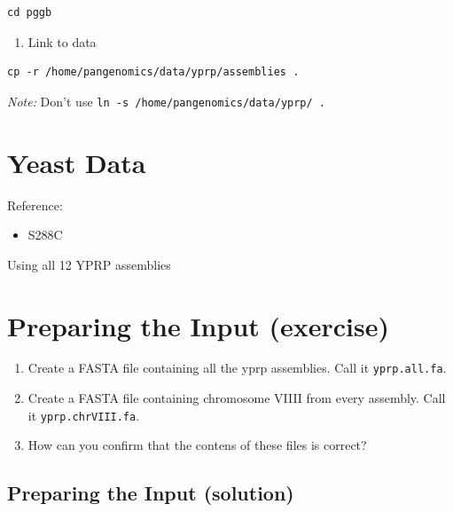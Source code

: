 \documentclass[
]{book}
\providecommand{\tightlist}{%
  \setlength{\itemsep}{0pt}\setlength{\parskip}{0pt}}
\begin{document}
\begin{verbatim}
cd pggb
\end{verbatim}

\begin{enumerate}
\def\labelenumi{\arabic{enumi}.}
\setcounter{enumi}{3}
\tightlist
\item
  Link to data
\end{enumerate}

\begin{verbatim}
cp -r /home/pangenomics/data/yprp/assemblies .
\end{verbatim}

\emph{Note:} Don't use \texttt{ln\ -s\ /home/pangenomics/data/yprp/\ .}

\hypertarget{yeast-data-2}{%
\section{Yeast Data}\label{yeast-data-2}}

Reference:

\begin{itemize}
\tightlist
\item
  S288C
\end{itemize}

Using all 12 YPRP assemblies

\hypertarget{preparing-the-input-exercise-2}{%
\section{Preparing the Input (exercise)}\label{preparing-the-input-exercise-2}}

\begin{enumerate}
\def\labelenumi{\arabic{enumi}.}
\tightlist
\item
  Create a FASTA file containing all the yprp assemblies. Call it \texttt{yprp.all.fa}.
\item
  Create a FASTA file containing chromosome VIIII from every assembly. Call it \texttt{yprp.chrVIII.fa}.
\item
  How can you confirm that the contens of these files is correct?
\end{enumerate}

\hypertarget{preparing-the-input-solution-1}{%
\subsection{Preparing the Input (solution)}\label{preparing-the-input-solution-1}}
\end{document}
